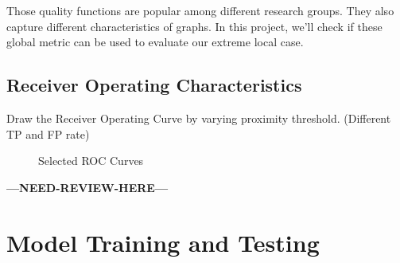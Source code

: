 \documentclass[11pt,a4paper]{article}
\newcommand{\question}{\textbf{---NEED-REVIEW-HERE---}}
\begin{document}
	Those quality functions are popular among different research 
	groups. They also capture different characteristics of graphs. 
	In this project, we'll check if these global metric can 
	be used to evaluate our extreme local case. 


\subsection{Receiver Operating Characteristics}

Draw the Receiver Operating Curve by varying proximity threshold. 
			(Different TP and FP rate)

\begin{figure}[htb]
\centering
{}
\caption{Selected ROC Curves}
\label{fig:roc_selected}
\end{figure}



\question


\section{Model Training and Testing}


%
%
%
\end{document}

